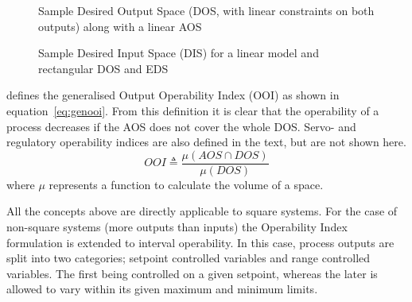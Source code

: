 \begin{figure}[htbp]
  \centering
  \scalebox{1}{}
  \caption[Sample Desired Output Space]{Sample Desired Output Space (DOS, with linear constraints on both outputs) along with a linear AOS}
  \label{fig:sampledos}
\end{figure}

\begin{figure}[htbp]
  \centering
  \scalebox{1}{}
  \caption[Sample Desired Input Space]{Sample Desired Input Space (DIS) for
    a linear model and rectangular DOS and EDS}
  \label{fig:sampledis}
\end{figure}

\citet{vinsonphd} defines the generalised Output Operability Index (OOI) as shown in equation~\ref{eq:genooi}. 
From this definition it is clear that the operability of a process decreases if the AOS does not cover the whole DOS. 
Servo- and regulatory operability indices are also defined in the text, but are not shown here.
\begin{equation}
  \label{eq:genooi}
     OOI \triangleq \frac{\mu(AOS\cap DOS)}{\mu(DOS)}
\end{equation}
where $\mu$ represents a function to calculate the volume of a space.

All the concepts above are directly applicable to square systems.
For the case of non-square systems (more outputs than inputs) the Operability Index formulation is extended to interval operability. 
In this case, process outputs are split into two categories; setpoint controlled variables and range controlled variables.
The first being controlled on a given setpoint, whereas the later is allowed to vary within its given maximum and minimum limits.

